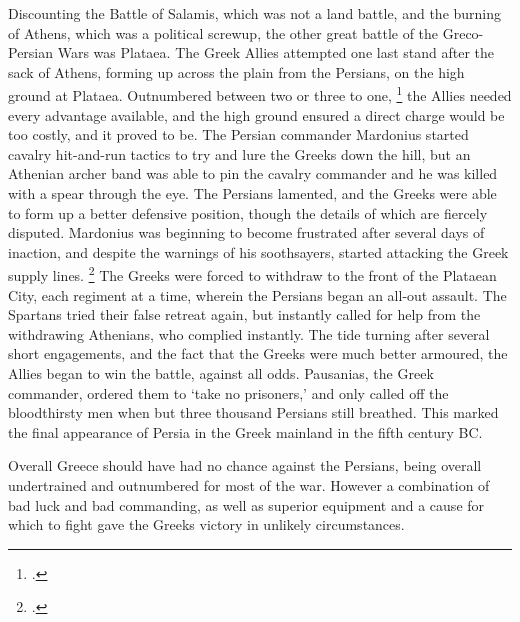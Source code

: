 \documentclass[twoside, a4paper, 12pt]{article}
\begin{document}
Discounting the Battle of Salamis, which was not a land battle, and the burning
of Athens, which was a political screwup, the other great battle of the
Greco-Persian Wars was Plataea. The Greek Allies attempted one last stand after
the sack of Athens, forming up across the plain from the Persians, on the
high ground at Plataea. Outnumbered between two or three to one,
\footcite[Book 9.31-2]{herodotus_1920}
the Allies needed every advantage available, and the high ground ensured a
direct charge would be too costly, and it proved to be. The Persian commander
Mardonius started cavalry hit-and-run tactics to try and lure the Greeks down the
hill, but an Athenian archer band was able to pin the cavalry commander and he
was killed with a spear through the eye.\footnotemark
The Persians lamented, and the Greeks were able to form up a better defensive
position, though the details of which are fiercely disputed.\footnotemark[\value{footnote}]
Mardonius was beginning to become frustrated after several days of inaction,
and despite the warnings of his soothsayers,
started attacking the Greek supply lines. \footcite[\emph{Arist.}15]{plutarch_1920}
The Greeks were forced to withdraw to the front of the Plataean City, each
regiment at a time, wherein the Persians began an all-out assault. The Spartans
tried their false retreat again, but instantly called for help from the withdrawing
Athenians, who complied instantly. \footnotemark
The tide turning after several short engagements, and the fact that the Greeks were
much better armoured, the Allies began to win the battle, against all odds.
Pausanias, the Greek commander, ordered them to `take no prisoners,' and only
called off the bloodthirsty men when but three thousand Persians still
breathed.\footnotemark[\value{footnote}]
This marked the final appearance of Persia in the Greek mainland in the
fifth century BC.
\par\vspace{1em}

Overall Greece should have had no chance against the Persians, being overall
undertrained and outnumbered for most of the war. However a combination
of bad luck and bad commanding, as well as superior equipment and a cause
for which to fight gave the Greeks victory in unlikely circumstances.

\newpage

\listoffigures
\printbibliography
\end{document}
